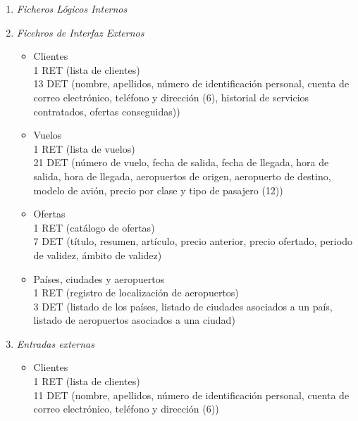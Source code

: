 
\begin{enumerate}
	\item\textit{Ficheros Lógicos Internos}
	\item\textit{Ficehros de Interfaz Externos}

		\begin{itemize}
			\item Clientes \\
			1 RET (lista de clientes)\\
			13 DET (nombre, apellidos, número de identificación personal, cuenta de correo electrónico, teléfono y dirección (6),
			historial de servicios contratados, ofertas conseguidas))\\
			\item Vuelos \\
			1 RET (lista de vuelos)\\
			21 DET (número de vuelo, fecha de salida, fecha de llegada, hora de salida, hora de llegada, aeropuertos de origen,
			aeropuerto de destino, modelo de avión, precio por clase y tipo de pasajero (12))\\
			\item Ofertas \\
			1 RET (catálogo de ofertas)\\
			7 DET (título, resumen, artículo, precio anterior, precio ofertado, periodo de validez, ámbito de validez)\\
			\item Países, ciudades y aeropuertos \\
			1 RET (registro de localización de aeropuertos)\\
			3 DET (listado de los países, listado de ciudades asociados a un país, listado de aeropuertos asociados a una ciudad)\\
		\end{itemize}

	\item \textit{Entradas externas}

		\begin{itemize}
			\item Clientes \\
			1 RET (lista de clientes)\\
			11 DET (nombre, apellidos, número de identificación personal, cuenta de correo electrónico, teléfono y dirección (6))\\
		\end{itemize}


\end{enumerate}
